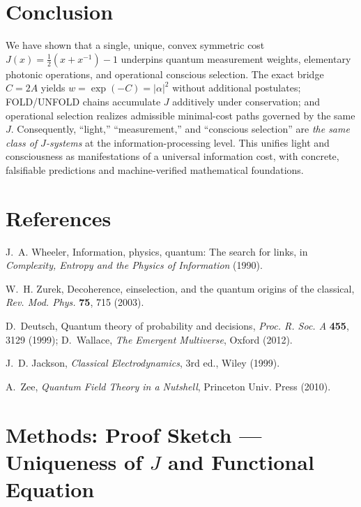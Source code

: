 \documentclass[12pt,a4paper]{article}
\begin{document}
\section{Conclusion}
We have shown that a single, unique, convex symmetric cost $J(x)=\tfrac{1}{2}(x+x^{-1})-1$ underpins quantum measurement weights, elementary photonic operations, and operational conscious selection. The exact bridge $C=2A$ yields $w=\exp(-C)=|\alpha|^{2}$ without additional postulates; FOLD/UNFOLD chains accumulate $J$ additively under conservation; and operational selection realizes admissible minimal-cost paths governed by the same $J$. Consequently, “light,” “measurement,” and “conscious selection” are \emph{the same class of $J$-systems} at the information-processing level. This unifies light and consciousness as manifestations of a universal information cost, with concrete, falsifiable predictions and machine-verified mathematical foundations.

\section*{References}
\begin{thebibliography}{99}
J.~A. Wheeler, Information, physics, quantum: The search for links,
in \emph{Complexity, Entropy and the Physics of Information} (1990).

W.~H. Zurek, Decoherence, einselection, and the quantum origins of the classical,
\emph{Rev. Mod. Phys.} \textbf{75}, 715 (2003).

D.~Deutsch, Quantum theory of probability and decisions, \emph{Proc. R. Soc. A} \textbf{455}, 3129 (1999);
D.~Wallace, \emph{The Emergent Multiverse}, Oxford (2012).

J.~D. Jackson, \emph{Classical Electrodynamics}, 3rd ed., Wiley (1999).

A.~Zee, \emph{Quantum Field Theory in a Nutshell}, Princeton Univ. Press (2010).

\end{thebibliography}


\appendix

\section{Methods: Proof Sketch — Uniqueness of $J$ and Functional Equation}\label{app:uniqJ}
\end{document}
